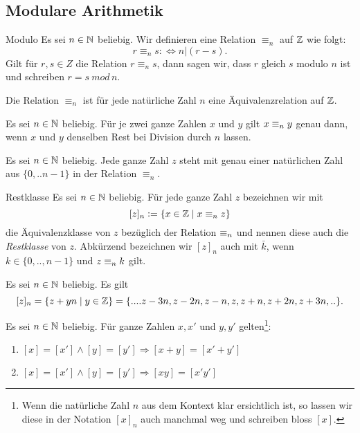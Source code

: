 \subsection{Modulare Arithmetik}

\begin{definition}{Modulo}
Es sei $n\in\mathbb{N}$ beliebig. Wir definieren eine Relation $\equiv_n$ auf $\mathbb{Z}$ wie folgt:
\[
 r\equiv_n s:\Leftrightarrow n|(r-s).
\]
Gilt für $r,s\in Z$ die Relation $r\equiv_ns$, dann sagen wir, dass $r$ gleich $s$ modulo $n$ ist und schreiben $r=s \:mod\, n$.
\end{definition}


\begin{remark}
 Die Relation $\equiv_n$ ist für jede natürliche Zahl $n$ eine Äquivalenzrelation auf $\mathbb{Z}$.
\end{remark}

\begin{remark}
Es sei $n\in\mathbb{N}$ beliebig. Für je zwei ganze Zahlen $x$ und $y$ gilt $x\equiv_n y$ genau dann, wenn $x$ und $y$ denselben Rest bei Division durch $n$ lassen.
\end{remark}


\begin{corollary}{}
 Es sei $n\in\mathbb{N}$ beliebig. Jede ganze Zahl $z$ steht mit genau einer natürlichen Zahl aus $\{0,..n-1\}$ in der Relation $\equiv_n$.
\end{corollary}

\begin{definition}{Restklasse}
Es sei $n\in\mathbb{N}$ beliebig. Für jede ganze Zahl $z$ bezeichnen wir mit
\[
 [z]_n:=\{x\in\mathbb{Z}\mid x\equiv_n z\}
\]
die Äquivalenzklasse von $z$ bezüglich der Relation $\equiv_n$ und nennen diese auch die \textit{Restklasse} von $z$. Abkürzend bezeichnen wir $[z]_n$ auch mit $\bar k$, wenn $k\in\{0,..,n-1\}$ und $z\equiv_n k$ gilt.
\end{definition}

\begin{corollary}{}
Es sei $n\in\mathbb{N}$ beliebig. Es gilt
\[
 [z]_n=\{z+yn\mid y\in\mathbb{Z}\}=\{....z-3n,z-2n,z-n,z,z+n,z+2n,z+3n,..\}.
\]
\end{corollary}


\begin{remark}
Es sei $n\in\mathbb{N}$ beliebig. Für ganze Zahlen $x,x'$ und $y,y'$ gelten\footnote{Wenn die natürliche Zahl $n$ aus dem Kontext klar ersichtlich ist, so lassen wir diese in der Notation $[x]_n$ auch manchmal weg und schreiben bloss $[x]$.}:
\begin{enumerate}
 \item $[x]=[x']\land [y]=[y']\Rightarrow [x+y]=[x'+y']$
 \item $[x]=[x']\land [y]=[y']\Rightarrow [xy]=[x'y']$
\end{enumerate}
\end{remark}

